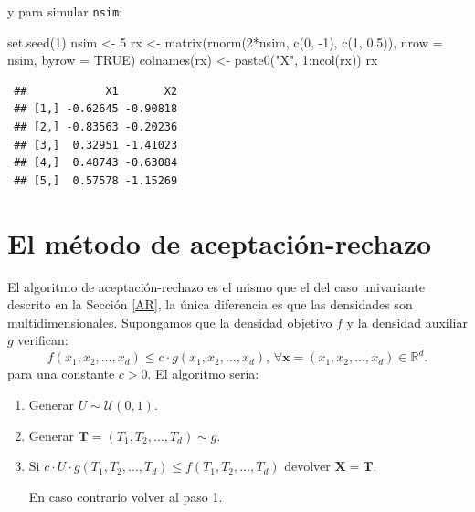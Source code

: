 \documentclass[
  10pt,
]{book}
\newenvironment{Shaded}{\begin{snugshade}}{\end{snugshade}}
\newcommand{\AttributeTok}[1]{\textcolor[rgb]{0.77,0.63,0.00}{#1}}
\newcommand{\ConstantTok}[1]{\textcolor[rgb]{0.00,0.00,0.00}{#1}}
\newcommand{\DecValTok}[1]{\textcolor[rgb]{0.00,0.00,0.81}{#1}}
\newcommand{\FloatTok}[1]{\textcolor[rgb]{0.00,0.00,0.81}{#1}}
\newcommand{\FunctionTok}[1]{\textcolor[rgb]{0.00,0.00,0.00}{#1}}
\newcommand{\NormalTok}[1]{#1}
\newcommand{\OtherTok}[1]{\textcolor[rgb]{0.56,0.35,0.01}{#1}}
\newcommand{\SpecialCharTok}[1]{\textcolor[rgb]{0.00,0.00,0.00}{#1}}
\newcommand{\StringTok}[1]{\textcolor[rgb]{0.31,0.60,0.02}{#1}}
\renewcommand{\mathbf}[1]{\symbf{#1}}
\theoremstyle{break}
\theoremstyle{nonumberplain}
\begin{document}
y para simular \texttt{nsim}:

\begin{Shaded}
\begin{Highlighting}[]
\FunctionTok{set.seed}\NormalTok{(}\DecValTok{1}\NormalTok{)}
\NormalTok{nsim }\OtherTok{\textless{}{-}} \DecValTok{5}
\NormalTok{rx }\OtherTok{\textless{}{-}} \FunctionTok{matrix}\NormalTok{(}\FunctionTok{rnorm}\NormalTok{(}\DecValTok{2}\SpecialCharTok{*}\NormalTok{nsim, }\FunctionTok{c}\NormalTok{(}\DecValTok{0}\NormalTok{, }\SpecialCharTok{{-}}\DecValTok{1}\NormalTok{), }\FunctionTok{c}\NormalTok{(}\DecValTok{1}\NormalTok{, }\FloatTok{0.5}\NormalTok{)), }\AttributeTok{nrow =}\NormalTok{ nsim, }\AttributeTok{byrow =} \ConstantTok{TRUE}\NormalTok{)}
\FunctionTok{colnames}\NormalTok{(rx) }\OtherTok{\textless{}{-}} \FunctionTok{paste0}\NormalTok{(}\StringTok{"X"}\NormalTok{, }\DecValTok{1}\SpecialCharTok{:}\FunctionTok{ncol}\NormalTok{(rx))}
\NormalTok{rx}
\end{Highlighting}
\end{Shaded}

\begin{verbatim}
 ##            X1       X2
 ## [1,] -0.62645 -0.90818
 ## [2,] -0.83563 -0.20236
 ## [3,]  0.32951 -1.41023
 ## [4,]  0.48743 -0.63084
 ## [5,]  0.57578 -1.15269
\end{verbatim}

\hypertarget{el-muxe9todo-de-aceptaciuxf3n-rechazo}{%
\section{El método de aceptación-rechazo}\label{el-muxe9todo-de-aceptaciuxf3n-rechazo}}

El algoritmo de aceptación-rechazo es el mismo que el del caso univariante descrito en la Sección \ref{AR}, la única diferencia es que las densidades son multidimensionales.
Supongamos que la densidad objetivo \(f\) y la densidad
auxiliar \(g\) verifican:
\[f\left( x_1,x_2,\ldots,x_d\right) \leq c\cdot g\left( x_1,x_2,\ldots,x_d\right) 
\text{, }\forall \mathbf{x} = \left( x_1,x_2,\ldots,x_d\right)\in \mathbb{R}^d\text{.}\]
para una constante \(c>0\).
El algoritmo sería:

\begin{enumerate}
\def\labelenumi{\arabic{enumi}.}
\item
  Generar \(U\sim \mathcal{U}\left( 0,1\right)\).
\item
  Generar \(\mathbf{T} = ( T_1, T_2, \ldots, T_d) \sim g\).
\item
  Si \(c \cdot U \cdot g( T_1, T_2, \ldots, T_d) \leq f( T_1, T_2, \ldots, T_d)\)
  devolver \(\mathbf{X}= \mathbf{T}\).

  En caso contrario volver al paso 1.
\end{enumerate}
\end{document}
